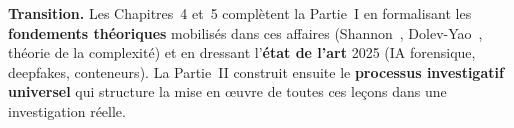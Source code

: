 \bigskip

\begin{boxinfo}
\textbf{Transition.} Les Chapitres~4 et~5 complètent la Partie~I en
formalisant les \textbf{fondements théoriques} mobilisés dans ces affaires
(Shannon~\cite{shannon1948}, Dolev-Yao~\cite{dolevyao1983}, théorie de la complexité) et en dressant l'\textbf{état
de l'art} 2025 (IA forensique, deepfakes, conteneurs). La Partie~II
construit ensuite le \textbf{processus investigatif universel} qui structure
la mise en œuvre de toutes ces leçons dans une investigation réelle.
\end{boxinfo}
